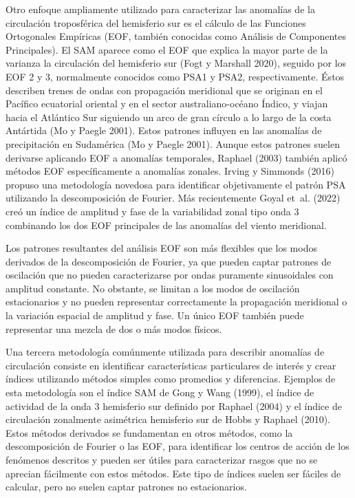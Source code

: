 \documentclass[12pt,oneside,a4paper]{reedthesis}
\begin{document}
Otro enfoque ampliamente utilizado para caracterizar las anomalías de la circulación troposférica del hemisferio sur es el cálculo de las Funciones Ortogonales Empíricas (EOF, también conocidas como Análisis de Componentes Principales).
El SAM aparece como el EOF que explica la mayor parte de la varianza la circulación del hemisferio sur (Fogt y Marshall 2020), seguido por los EOF 2 y 3, normalmente conocidos como PSA1 y PSA2, respectivamente.
Éstos describen trenes de ondas con propagación meridional que se originan en el Pacífico ecuatorial oriental y en el sector australiano-océano Índico, y viajan hacia el Atlántico Sur siguiendo un arco de gran círculo a lo largo de la costa Antártida (Mo y Paegle 2001).
Estos patrones influyen en las anomalías de precipitación en Sudamérica (Mo y Paegle 2001).
Aunque estos patrones suelen derivarse aplicando EOF a anomalías temporales, Raphael (2003) también aplicó métodos EOF específicamente a anomalías zonales.
Irving y Simmonds (2016) propuso una metodología novedosa para identificar objetivamente el patrón PSA utilizando la descomposición de Fourier.
Más recientemente Goyal et~al. (2022) creó un índice de amplitud y fase de la variabilidad zonal tipo onda 3 combinando los dos EOF principales de las anomalías del viento meridional.

Los patrones resultantes del análisis EOF son más flexibles que los modos derivados de la descomposición de Fourier, ya que pueden captar patrones de oscilación que no pueden caracterizarse por ondas puramente sinusoidales con amplitud constante.
No obstante, se limitan a los modos de oscilación estacionarios y no pueden representar correctamente la propagación meridional o la variación espacial de amplitud y fase.
Un único EOF también puede representar una mezcla de dos o más modos físicos.

Una tercera metodología comúnmente utilizada para describir anomalías de circulación consiste en identificar características particulares de interés y crear índices utilizando métodos simples como promedios y diferencias.
Ejemplos de esta metodología son el índice SAM de Gong y Wang (1999), el índice de actividad de la onda 3 hemisferio sur definido por Raphael (2004) y el índice de circulación zonalmente asimétrica hemisferio sur de Hobbs y Raphael (2010).
Estos métodos derivados se fundamentan en otros métodos, como la descomposición de Fourier o las EOF, para identificar los centros de acción de los fenómenos descritos y pueden ser útiles para caracterizar rasgos que no se aprecian fácilmente con estos métodos.
Este tipo de índices suelen ser fáciles de calcular, pero no suelen captar patrones no estacionarios.
\end{document}
